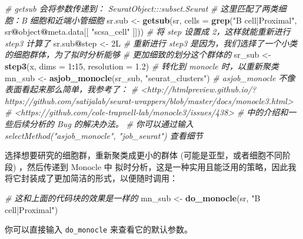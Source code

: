 \documentclass[
]{article}
\newenvironment{Shaded}{\begin{snugshade}}{\end{snugshade}}
\newcommand{\CommentTok}[1]{\textcolor[rgb]{0.56,0.35,0.01}{\textit{#1}}}
\newcommand{\DataTypeTok}[1]{\textcolor[rgb]{0.13,0.29,0.53}{#1}}
\newcommand{\DecValTok}[1]{\textcolor[rgb]{0.00,0.00,0.81}{#1}}
\newcommand{\FloatTok}[1]{\textcolor[rgb]{0.00,0.00,0.81}{#1}}
\newcommand{\KeywordTok}[1]{\textcolor[rgb]{0.13,0.29,0.53}{\textbf{#1}}}
\newcommand{\NormalTok}[1]{#1}
\newcommand{\OperatorTok}[1]{\textcolor[rgb]{0.81,0.36,0.00}{\textbf{#1}}}
\newcommand{\StringTok}[1]{\textcolor[rgb]{0.31,0.60,0.02}{#1}}
\begin{document}
\begin{Shaded}
\begin{Highlighting}[]
\CommentTok{\# getsub 会将参数传递到： SeuratObject:::subset.Seurat}
\CommentTok{\# 这里匹配了两类细胞：B 细胞和近端小管细胞}
\NormalTok{sr.sub \textless{}{-}}\StringTok{ }\KeywordTok{getsub}\NormalTok{(sr, }\DataTypeTok{cells =} \KeywordTok{grep}\NormalTok{(}\StringTok{"B cell|Proximal"}\NormalTok{, sr}\OperatorTok{@}\NormalTok{object}\OperatorTok{@}\NormalTok{meta.data[[ }\StringTok{"scsa\_cell"}\NormalTok{ ]]))}
\CommentTok{\# 将 step 设置成 2，这样就能重新进行 step3 计算了}
\NormalTok{sr.sub}\OperatorTok{@}\NormalTok{step \textless{}{-}}\StringTok{ }\NormalTok{2L}
\CommentTok{\# 重新进行 step3 是因为，我们选择了一个小类的细胞群体，为了拟时分析能够}
\CommentTok{\# 更加细致的划分这个群体的}
\NormalTok{sr\_sub \textless{}{-}}\StringTok{ }\KeywordTok{step3}\NormalTok{(x, }\DataTypeTok{dims =} \DecValTok{1}\OperatorTok{:}\DecValTok{15}\NormalTok{, }\DataTypeTok{resolution =} \FloatTok{1.2}\NormalTok{)}
\CommentTok{\# 转化到 monocle 时，以重新聚类}
\NormalTok{mn\_sub \textless{}{-}}\StringTok{ }\KeywordTok{asjob\_monocle}\NormalTok{(sr\_sub, }\StringTok{"seurat\_clusters"}\NormalTok{)}
\CommentTok{\# \textasciigrave{}asjob\_monocle\textasciigrave{} 不像表面看起来那么简单，我参考了：}
\CommentTok{\# \textless{}http://htmlpreview.github.io/?https://github.com/satijalab/seurat{-}wrappers/blob/master/docs/monocle3.html\textgreater{}}
\CommentTok{\# \textless{}https://github.com/cole{-}trapnell{-}lab/monocle3/issues/438\textgreater{}}
\CommentTok{\# 中的介绍和一些后续分析的 Bug 的解决办法。}
\CommentTok{\# 你可以通过输入 \textasciigrave{}selectMethod("asjob\_monocle", "job\_seurat")\textasciigrave{} 查看细节}
\end{Highlighting}
\end{Shaded}

选择想要研究的细胞群，重新聚类成更小的群体 (可能是亚型，或者细胞不同阶段) ，然后传递到 Monocle 中
拟时分析，这是一种实用且能泛用的策略，因此我将它封装成了更加简洁的形式，以便随时调用：

\begin{Shaded}
\begin{Highlighting}[]
\CommentTok{\# 这和上面的代码块的效果是一样的}
\NormalTok{mn\_sub \textless{}{-}}\StringTok{ }\KeywordTok{do\_monocle}\NormalTok{(sr, }\StringTok{"B cell|Proximal"}\NormalTok{)}
\end{Highlighting}
\end{Shaded}

你可以直接输入 \texttt{do\_monocle} 来查看它的默认参数。
\end{document}
